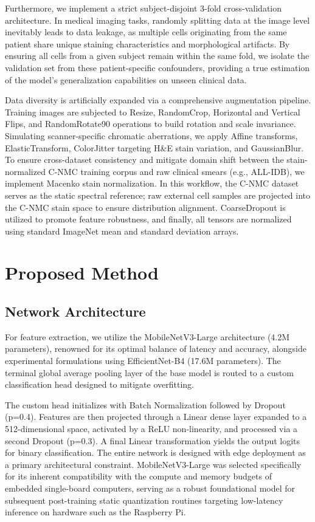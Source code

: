 \documentclass[journal]{IEEEtran}
\begin{document}
    Furthermore, we implement a strict subject-disjoint 3-fold cross-validation architecture. In medical imaging tasks, randomly splitting data at the image level inevitably leads to data leakage, as multiple cells originating from the same patient share unique staining characteristics and morphological artifacts. By ensuring all cells from a given subject remain within the same fold, we isolate the validation set from these patient-specific confounders, providing a true estimation of the model's generalization capabilities on unseen clinical data.

    Data diversity is artificially expanded via a comprehensive augmentation pipeline. Training images are subjected to Resize, RandomCrop, Horizontal and Vertical Flips, and RandomRotate90 operations to build rotation and scale invariance. Simulating scanner-specific chromatic aberrations, we apply Affine transforms, ElasticTransform, ColorJitter targeting H\&E stain variation, and GaussianBlur. To ensure cross-dataset consistency and mitigate domain shift between the stain-normalized C-NMC training corpus and raw clinical smears (e.g., ALL-IDB), we implement Macenko stain normalization. In this workflow, the C-NMC dataset serves as the static spectral reference; raw external cell samples are projected into the C-NMC stain space to ensure distribution alignment. CoarseDropout is utilized to promote feature robustness, and finally, all tensors are normalized using standard ImageNet mean and standard deviation arrays.

    \section{Proposed Method}
    \subsection{Network Architecture}
    For feature extraction, we utilize the MobileNetV3-Large architecture (4.2M parameters), renowned for its optimal balance of latency and accuracy, alongside experimental formulations using EfficientNet-B4 (17.6M parameters). The terminal global average pooling layer of the base model is routed to a custom classification head designed to mitigate overfitting. 

    The custom head initializes with Batch Normalization followed by Dropout (p=0.4). Features are then projected through a Linear dense layer expanded to a 512-dimensional space, activated by a ReLU non-linearity, and processed via a second Dropout (p=0.3). A final Linear transformation yields the output logits for binary classification. The entire network is designed with edge deployment as a primary architectural constraint. MobileNetV3-Large was selected specifically for its inherent compatibility with the compute and memory budgets of embedded single-board computers, serving as a robust foundational model for subsequent post-training static quantization routines targeting low-latency inference on hardware such as the Raspberry Pi.
\end{document}
